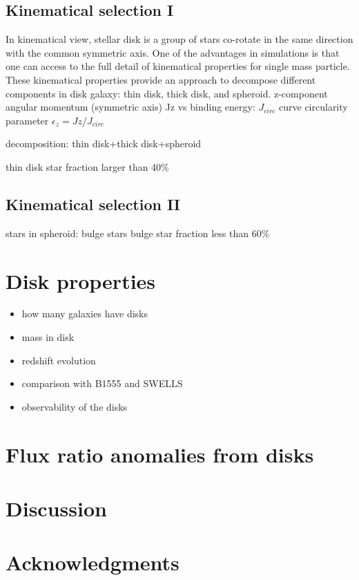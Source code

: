 \documentclass[useAMS,usenatbib]{mn2e}
\begin{document}
\subsection{Kinematical selection I}
In kinematical view, stellar disk is a group of stars co-rotate in the same direction with the common symmetric axis. One of the advantages in simulations is that one can access to the full detail of kinematical properties for single mass particle. These kinematical properties provide an approach to decompose different components in disk galaxy: thin disk, thick disk, and spheroid.
z-component angular momentum (symmetric axis)
Jz vs binding energy: $J_{circ}$ curve
circularity parameter $\epsilon_z = Jz/J_{circ}$

decomposition: thin disk+thick disk+spheroid

thin disk star fraction larger than 40\%

\subsection{Kinematical selection II}
stars in spheroid: bulge stars
bulge star fraction less than 60\%
\section{Disk properties}
\begin{itemize}
\item how many galaxies have disks
\item mass in disk
\item redshift evolution
\item comparison with B1555 and SWELLS
\item observability of the disks
\end{itemize}
\section{Flux ratio anomalies from disks}

\section{Discussion}
\section*{Acknowledgments}







\label{lastpage}
\end{document}
